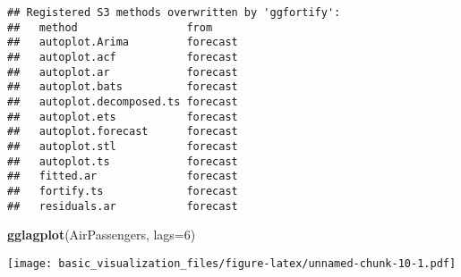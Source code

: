 \documentclass[
]{article}
\newenvironment{Shaded}{\begin{snugshade}}{\end{snugshade}}
\newcommand{\AttributeTok}[1]{\textcolor[rgb]{0.13,0.29,0.53}{#1}}
\newcommand{\DecValTok}[1]{\textcolor[rgb]{0.00,0.00,0.81}{#1}}
\newcommand{\FunctionTok}[1]{\textcolor[rgb]{0.13,0.29,0.53}{\textbf{#1}}}
\newcommand{\NormalTok}[1]{#1}
\begin{document}
\begin{verbatim}
## Registered S3 methods overwritten by 'ggfortify':
##   method                 from    
##   autoplot.Arima         forecast
##   autoplot.acf           forecast
##   autoplot.ar            forecast
##   autoplot.bats          forecast
##   autoplot.decomposed.ts forecast
##   autoplot.ets           forecast
##   autoplot.forecast      forecast
##   autoplot.stl           forecast
##   autoplot.ts            forecast
##   fitted.ar              forecast
##   fortify.ts             forecast
##   residuals.ar           forecast
\end{verbatim}

\begin{Shaded}
\begin{Highlighting}[]
\FunctionTok{gglagplot}\NormalTok{(AirPassengers, }\AttributeTok{lags=}\DecValTok{6}\NormalTok{)}
\end{Highlighting}
\end{Shaded}

\texttt{[image: basic\_visualization\_files/figure-latex/unnamed-chunk-10-1.pdf]}
\end{document}
